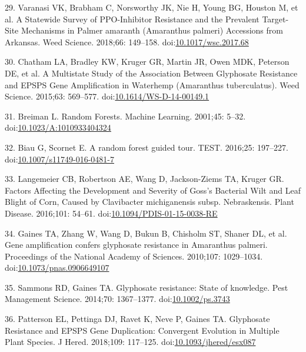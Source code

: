 \documentclass[10pt,letterpaper]{article}
\begin{document}
\leavevmode\hypertarget{ref-varanasi_statewide_2018}{}%
29. Varanasi VK, Brabham C, Norsworthy JK, Nie H, Young BG, Houston M,
et al. A Statewide Survey of PPO-Inhibitor Resistance and the Prevalent
Target-Site Mechanisms in Palmer amaranth (Amaranthus palmeri)
Accessions from Arkansas. Weed Science. 2018;66: 149--158.
doi:\href{https://doi.org/10.1017/wsc.2017.68}{10.1017/wsc.2017.68}

\leavevmode\hypertarget{ref-chatham_multistate_2015}{}%
30. Chatham LA, Bradley KW, Kruger GR, Martin JR, Owen MDK, Peterson DE,
et al. A Multistate Study of the Association Between Glyphosate
Resistance and EPSPS Gene Amplification in Waterhemp (Amaranthus
tuberculatus). Weed Science. 2015;63: 569--577.
doi:\href{https://doi.org/10.1614/WS-D-14-00149.1}{10.1614/WS-D-14-00149.1}

\leavevmode\hypertarget{ref-breiman_random_2001}{}%
31. Breiman L. Random Forests. Machine Learning. 2001;45: 5--32.
doi:\href{https://doi.org/10.1023/A:1010933404324}{10.1023/A:1010933404324}

\leavevmode\hypertarget{ref-biau_random_2016}{}%
32. Biau G, Scornet E. A random forest guided tour. TEST. 2016;25:
197--227.
doi:\href{https://doi.org/10.1007/s11749-016-0481-7}{10.1007/s11749-016-0481-7}

\leavevmode\hypertarget{ref-langemeier_factors_2016}{}%
33. Langemeier CB, Robertson AE, Wang D, Jackson-Ziems TA, Kruger GR.
Factors Affecting the Development and Severity of Goss's Bacterial Wilt
and Leaf Blight of Corn, Caused by Clavibacter michiganensis subsp.
Nebraskensis. Plant Disease. 2016;101: 54--61.
doi:\href{https://doi.org/10.1094/PDIS-01-15-0038-RE}{10.1094/PDIS-01-15-0038-RE}

\leavevmode\hypertarget{ref-gaines_gene_2010}{}%
34. Gaines TA, Zhang W, Wang D, Bukun B, Chisholm ST, Shaner DL, et al.
Gene amplification confers glyphosate resistance in Amaranthus palmeri.
Proceedings of the National Academy of Sciences. 2010;107: 1029--1034.
doi:\href{https://doi.org/10.1073/pnas.0906649107}{10.1073/pnas.0906649107}

\leavevmode\hypertarget{ref-sammons_glyphosate_2014}{}%
35. Sammons RD, Gaines TA. Glyphosate resistance: State of knowledge.
Pest Management Science. 2014;70: 1367--1377.
doi:\href{https://doi.org/10.1002/ps.3743}{10.1002/ps.3743}

\leavevmode\hypertarget{ref-patterson_glyphosate_2018}{}%
36. Patterson EL, Pettinga DJ, Ravet K, Neve P, Gaines TA. Glyphosate
Resistance and EPSPS Gene Duplication: Convergent Evolution in Multiple
Plant Species. J Hered. 2018;109: 117--125.
doi:\href{https://doi.org/10.1093/jhered/esx087}{10.1093/jhered/esx087}
\end{document}

